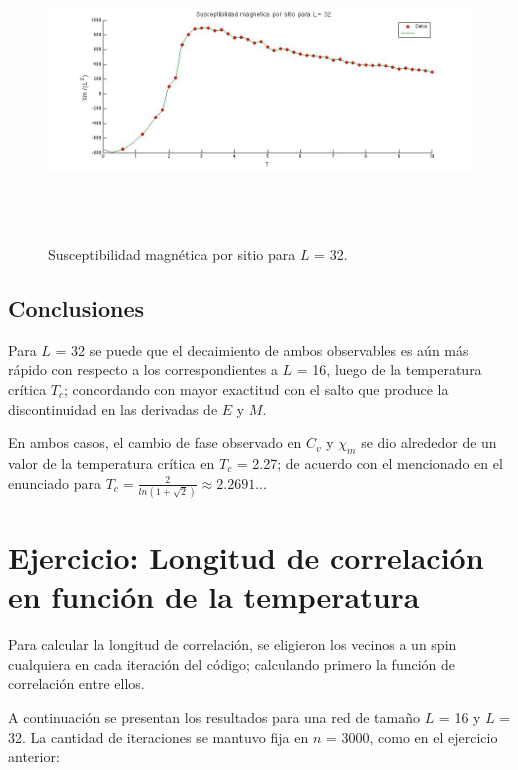 \documentclass[a4paper,12pt]{article}
\begin{document}
\begin{figure}[H]
\begin{center}
\includegraphics[height=8cm]{../graficos/Xm_L32.jpg}
\caption[width=5cm]{Susceptibilidad magn\'etica por sitio para $L$ = 32.}
\end{center}
\end{figure}

\subsection{Conclusiones}

Para $L$ = 32 se puede que el decaimiento de ambos observables es a\'un m\'as r\'apido con respecto a los correspondientes a $L$ = 16, luego de la temperatura cr\'itica $T_{c}$; concordando con mayor exactitud con el salto que produce la discontinuidad en las derivadas de $E$ y $M$.

En ambos casos, el cambio de fase observado en $C_{v}$ y $\chi_{m}$ se dio alrededor de un valor de la temperatura cr\'itica en $T_{c}$ = 2.27; de acuerdo con el mencionado en el enunciado para $T_{c} = \frac{2}{ln(1+\sqrt{2})} \approx 2.2691...$


\section{Ejercicio: Longitud de correlaci\'on en funci\'on de la temperatura}

Para calcular la longitud de correlaci\'on, se eligieron los vecinos a un spin cualquiera en cada iteraci\'on del c\'odigo; calculando primero la funci\'on de correlaci\'on entre ellos. 

A continuaci\'on se presentan los resultados para una red de tama\~no $L$ = 16 y $L$ = 32. La cantidad de iteraciones se mantuvo fija en $n$ = 3000, como en el ejercicio anterior:
\end{document}
